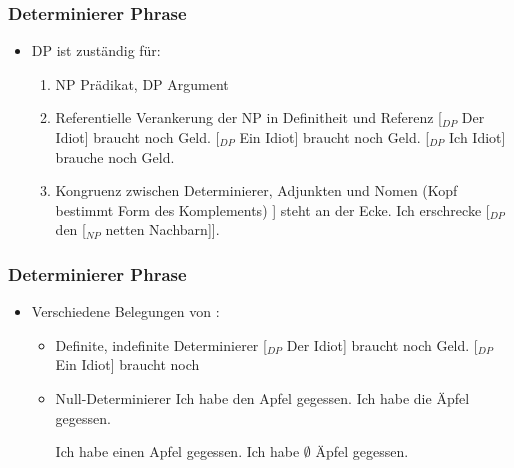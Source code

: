 \begin{frame}
\frametitle{Determinierer Phrase}

	\begin{itemize}
		\item DP ist zuständig für:
		\begin{enumerate}
			\item NP \ras Prädikat, DP \ras Argument 
			\eal 
			\zl
			
			\item Referentielle Verankerung der NP in Definitheit und Referenz
			\eal
			\ex \alert{[$_{DP}$ Der Idiot]} braucht noch Geld.
			\ex \alert{[$_{DP}$ Ein Idiot]} braucht noch Geld.
			\ex \alert{[$_{DP}$ Ich Idiot]} brauche noch Geld.
			\zl

			\item Kongruenz zwischen Determinierer, Adjunkten und Nomen (Kopf bestimmt Form des Komplements)
			\eal 
			\ex [$_{DP}$ Der [$_{NP}$ \alert{nette Nachbar}]] steht an der Ecke.
			\ex Ich erschrecke [$_{DP}$ den [$_{NP}$ \alert{netten Nachbarn}]].
			\zl

		\end{enumerate}					
	\end{itemize}

\end{frame}


\begin{frame}
\frametitle{Determinierer Phrase}

\begin{itemize}
	\item Verschiedene Belegungen von :
	\begin{itemize}
		\item Definite, indefinite Determinierer
		\eal
		\ex \alert{[$_{DP}$ Der Idiot]} braucht noch Geld.
		\ex \alert{[$_{DP}$ Ein Idiot]} braucht noch 
		\zl

\pause		
		\item Null-Determinierer 
		\eal 
		\ex Ich habe \alert{den Apfel} gegessen.
		\ex Ich habe \alert{die Äpfel} gegessen.
		\zl			

\pause		
		\eal
		\ex Ich habe \alert{einen Apfel} gegessen.
		\ex Ich habe \alert{$\emptyset$ Äpfel} gegessen.
		\zl			
		
	\end{itemize}
\end{itemize}

\end{frame}


